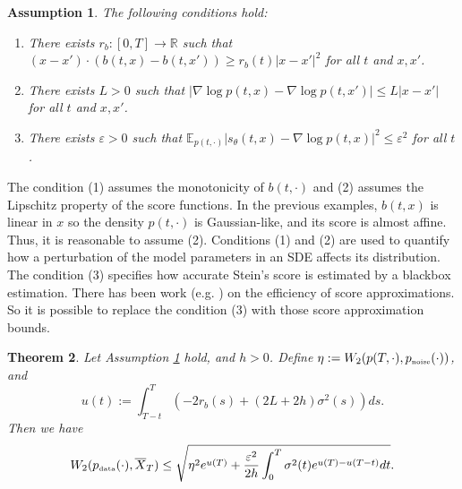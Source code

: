 \documentclass[letterpaper,11pt,reqno]{amsart}
\newtheorem{theorem}{Theorem}[section]
\newtheorem{assump}[theorem]{Assumption}
\numberwithin{equation}{section}
\begin{document}
\begin{assump}
\label{assump:sensitivity}
The following conditions hold:
\begin{enumerate}[itemsep = 3 pt]
\item
There exists $r_b: [0,T] \to \mathbb{R}$ such that 
$(x - x') \cdot (b(t,x) - b(t,x')) \ge r_b(t) |x - x'|^2$ for all $t$ and $x,x'$.
\item
There exists $L > 0$ such that $|\nabla \log p(t,x) - \nabla \log p(t,x')| \le L |x-x'|$ for all $t$ and $x,x'$.
\item
There exists $\varepsilon > 0$ such that $\mathbb{E}_{p(t,\cdot)}|s_{\theta}(t,x) - \nabla \log p(t,x)|^2 \le \varepsilon^2$ for all $t$.
\end{enumerate}
\end{assump}

\quad  The condition (1) assumes the monotonicity of $b(t, \cdot)$
and (2) assumes the Lipschitz property of the score functions. 
In the previous examples, 
$b(t,x)$ is linear in $x$ 
so the density $p(t, \cdot)$ is Gaussian-like,
and its score is almost affine.
Thus, it is reasonable to assume (2).
Conditions (1) and (2) 
are used to quantify how a perturbation of the model parameters in an SDE
affects its distribution. 
The condition (3) specifies how accurate Stein's score is estimated by 
a blackbox estimation. 
There has been work (e.g. \cite{CH23, Koe22, Oko23}) on the efficiency of score approximations.
So it is possible to replace the condition (3) with those score approximation bounds.

\begin{theorem}
\label{thm:sensitivity}
Let Assumption \ref{assump:sensitivity} hold, and $h > 0$.
Define $\eta:=W_2(p(T, \cdot), p_{\tiny \mbox{noise}}(\cdot))$,
and
\begin{equation}
\label{eq:uv}
u(t):=\int_{T-t}^T \left(-2 r_b(s) + (2L + 2h) \sigma^2(s) \right)ds.
\end{equation}
Then we have 
\begin{equation}
\label{eq:sensitivity}
W_2(p_{\tiny \mbox{data}}(\cdot), \overline{X}_T) \le \sqrt{\eta^2 e^{u(T)} + \frac{\varepsilon^2}{2h} \int_0^T \sigma^2(t) e^{u(T)-u(T-t)} dt}.
\end{equation}
\end{theorem}
\end{document}
